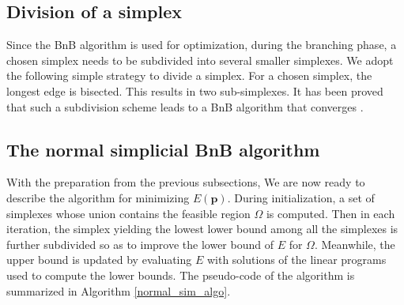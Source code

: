 \documentclass[11pt,bezier,]{article}
\begin{document}
\subsection{Division of a simplex\label{subsec:branch}}
Since the BnB algorithm is used for optimization, 
during the branching phase, 
a chosen simplex needs to be subdivided into several smaller simplexes.
We adopt the following simple strategy to divide a simplex. For a chosen simplex, 
the longest edge is bisected. 
This results in two sub-simplexes. 
It has been proved that such a subdivision scheme leads to a BnB algorithm that converges \cite{book_concave}.


\subsection{The normal simplicial BnB algorithm}

With the preparation from the previous subsections, 
We are now ready to describe the algorithm for minimizing $E(\mathbf p)$. 
During initialization, 
a set of simplexes whose union contains the feasible region $\Omega$ is computed. 
Then in each iteration, 
the simplex yielding the lowest lower bound among all the simplexes is further subdivided 
so as to improve the lower bound of $E$ for $\Omega$.
Meanwhile, 
the upper bound is updated by evaluating $E$ 
with solutions of the linear programs used to compute the lower bounds. 
The pseudo-code of the algorithm is summarized in Algorithm \ref{normal_sim_algo}.
\end{document}
